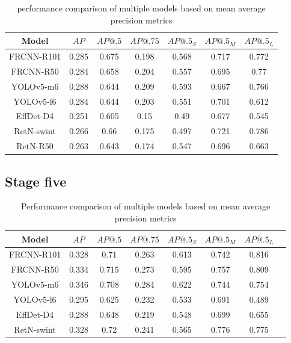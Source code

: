 \begin{table}[H]
    \begin{tabular}{|c|c|c|c|c|c|c|}
        \hline
        Model      & $AP$  & $AP@.5$ & $AP@.75$ & $AP@.5_S$ & $AP@.5_M$ & $AP@.5_L$ \\ \hline
        FRCNN-R101 & 0.285 & 0.675   & 0.198    & 0.568     & 0.717     & 0.772     \\ \hline
        FRCNN-R50  & 0.284 & 0.658   & 0.204    & 0.557     & 0.695     & 0.77      \\ \hline
        YOLOv5-m6  & 0.288 & 0.644   & 0.209    & 0.593     & 0.667     & 0.766     \\ \hline
        YOLOv5-l6  & 0.284 & 0.644   & 0.203    & 0.551     & 0.701     & 0.612     \\ \hline
        EffDet-D4  & 0.251 & 0.605   & 0.15     & 0.49      & 0.677     & 0.545     \\ \hline
        RetN-swint & 0.266 & 0.66    & 0.175    & 0.497     & 0.721     & 0.786     \\ \hline
        RetN-R50   & 0.263 & 0.643   & 0.174    & 0.547     & 0.696     & 0.663     \\ \hline
    \end{tabular}
    \caption{performance comparison of multiple models based on mean average precision metrics}
    \label{tab:model_results:stage_four}
\end{table}

\subsection{Stage five}

\begin{table}[H]
    \begin{tabular}{|c|c|c|c|c|c|c|c|}
        \hline
        Model      & $AP$  & $AP@.5$ & $AP@.75$ & $AP@.5_S$ & $AP@.5_M$ & $AP@.5_L$ \\ \hline
        FRCNN-R101 & 0.328 & 0.71    & 0.263    & 0.613     & 0.742     & 0.816     \\ \hline
        FRCNN-R50  & 0.334 & 0.715   & 0.273    & 0.595     & 0.757     & 0.809     \\ \hline
        YOLOv5-m6  & 0.346 & 0.708   & 0.284    & 0.622     & 0.744     & 0.754     \\ \hline
        YOLOv5-l6  & 0.295 & 0.625   & 0.232    & 0.533     & 0.691     & 0.489     \\ \hline
        EffDet-D4  & 0.288 & 0.648   & 0.219    & 0.548     & 0.699     & 0.655     \\ \hline
        RetN-swint & 0.328 & 0.72    & 0.241    & 0.565     & 0.776     & 0.775     \\ \hline
    \end{tabular}
    \caption{Performance comparison of multiple models based on mean average precision metrics}
    \label{tab:model_results:stage_five}
\end{table}

